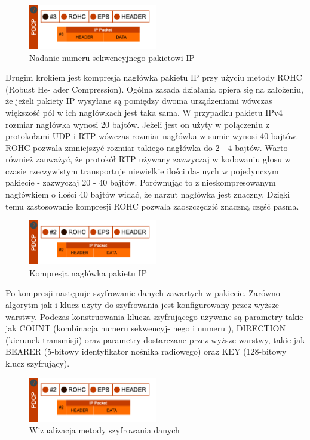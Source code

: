 \begin{figure}
	\centering
		\includegraphics[width=0.5\textwidth]{images/pdcp_1.png}
	\caption{Nadanie numeru sekwencyjnego pakietowi IP}
	\label{fig:pdcp1}
\end{figure}

Drugim krokiem jest kompresja nagłówka pakietu IP przy użyciu metody ROHC (Robust He- ader Compression). Ogólna zasada działania opiera się na założeniu, że jeżeli pakiety IP wysyłane są pomiędzy dwoma urządzeniami wówczas większość pól w ich nagłówkach jest taka sama. W przypadku pakietu IPv4 rozmiar nagłówka wynosi 20 bajtów. Jeżeli jest on użyty w połączeniu z protokołami UDP i RTP wówczas rozmiar nagłówka w sumie wynosi 40 bajtów. ROHC pozwala zmniejszyć rozmiar takiego nagłówka do 2 - 4 bajtów. Warto również zauważyć, że protokół RTP używany zazwyczaj w kodowaniu głosu w czasie rzeczywistym transportuje niewielkie ilości da- nych w pojedynczym pakiecie - zazwyczaj 20 - 40 bajtów. Porównując to z nieskompresowanym nagłówkiem o ilości 40 bajtów widać, że narzut nagłówka jest znaczny. Dzięki temu zastosowanie kompresji ROHC pozwala zaoszczędzić znaczną część pasma.

\begin{figure}
	\centering
		\includegraphics[width=0.5\textwidth]{images/pdcp_2.png}
	\caption{Kompresja nagłówka pakietu IP}
	\label{fig:pdcp2}
\end{figure}


Po kompresji następuje szyfrowanie danych zawartych w pakiecie. Zarówno algorytm jak i klucz użyty do szyfrowania jest konfigurowany przez wyższe warstwy. Podczas konstruowania klucza szyfrującego używane są parametry takie jak COUNT (kombinacja numeru sekwencyj- nego i numeru ), DIRECTION (kierunek transmisji) oraz parametry dostarczane przez wyższe warstwy, takie jak BEARER (5-bitowy identyfikator nośnika radiowego) oraz KEY (128-bitowy klucz szyfrujący).

\begin{figure}
	\centering
		\includegraphics[width=0.5\textwidth]{images/pdcp_2.png}
	\caption{Wizualizacja metody szyfrowania danych}
	\label{fig:pdcp3}
\end{figure}

